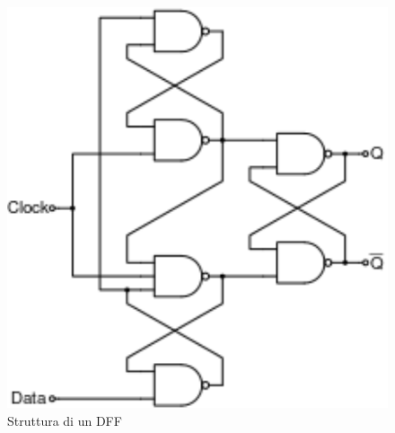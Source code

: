 \documentclass[12pt, a4paper]{report}
\begin{document}
\begin{figure}[h]
    \centering
    \includegraphics[scale=0.4,angle=0]{dff_struttura.png}
    \caption{Struttura di un DFF}
    \label{dff_struttura}
\end{figure}
\end{document}
